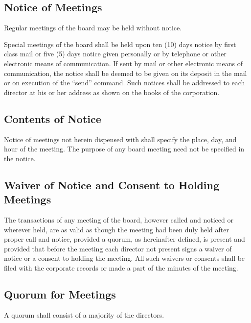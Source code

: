 \documentclass{article}
\begin{document}
	\subsection{Notice of Meetings}
	Regular meetings of the board may be held without notice.
	
	Special meetings of the board shall be held upon ten (10) days notice by first class mail or five (5) days notice given personally or by telephone or other electronic means of communication. If sent by mail or other electronic means of communication, the notice shall be deemed to be given on its deposit in the mail or on execution of the ``send'' command. Such notices shall be addressed to each director at his or her address as shown on the books of the corporation.
	
	\subsection{Contents of Notice}
	Notice of meetings not herein dispensed with shall specify the place, day, and hour of the meeting. The purpose of any board meeting need not be specified in the notice.
	\subsection{Waiver of Notice and Consent to Holding Meetings}
	The transactions of any meeting of the board, however called and noticed or wherever held, are as valid as though the meeting had been duly held after proper call and notice, provided a quorum, as hereinafter defined, is present and provided that before the meeting each director not present signs a waiver of notice or a consent to holding the meeting. All such waivers or consents shall be filed with the corporate records or made a part of the minutes of the meeting.
	\subsection{Quorum for Meetings}
	A quorum shall consist of a majority of the directors.
	
\end{document}
